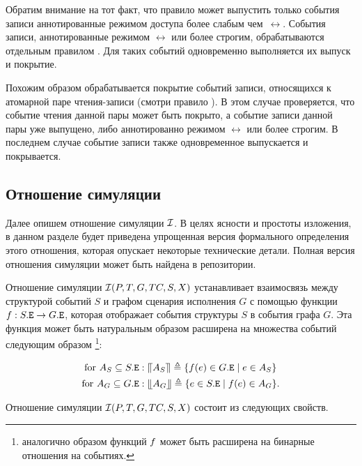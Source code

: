Обратим внимание на тот факт, что правило \IssueStep может выпустить
только события записи аннотированные режимом доступа 
более слабым чем~$\rel$. 
События записи, аннотированные режимом $\rel$ или более строгим, 
обрабатываются отдельным правилом \ReleaseCoverStep. 
Для таких событий одновременно выполняется их выпуск и покрытие.

Похожим образом обрабатывается покрытие событий записи, 
относящихся к атомарной паре чтения-записи (смотри правило \RMWCoverStep). 
В этом случае проверяется, что событие чтения данной 
пары может быть покрыто, а событие записи данной пары уже выпущено, 
либо аннотированно режимом $\rel$ или более строгим. 
В последнем случае событие записи также 
одновременное выпускается и покрывается. 

\subsection{Отношение симуляции}
\label{sec:simrel}

Далее опишем отношение симуляции $\mathcal{I}$.
В целях ясности и простоты изложения, 
в данном разделе будет приведена упрощенная версия формального
определения этого отношения, которая опускает некоторые
технические детали. Полная версия отношения симуляции
может быть найдена в \coq репозитории. 

Отношение симуляции $\mathcal{I}(P, T, G, TC, S, X)$
устанавливает взаимосвязь между структурой событий $S$
и графом сценария исполнения $G$ с помощью
функции $f : S.{\mathtt{E}} \rightarrow G.{\mathtt{E}}$, которая отображает
события структуры $S$ в события графа $G$.
Эта функция может быть натуральным образом
расширена на множества событий следующим образом%
\footnote{аналогично образом функций $f$ может быть расширена
на бинарные отношения на событиях.}:

\begin{align*}
\text{for } A_S \subseteq S.{\mathtt{E}}        & :
  {\llceil A_S \rrceil} \triangleq \{f(e) \in G.{\mathtt{E}} \mid e \in A_S\} \\
\text{for } A_G \subseteq G.{\mathtt{E}}        & :
  {\llfloor A_G \rrfloor} \triangleq \{e \in S.{\mathtt{E}} \mid f(e) \in A_G\}.
\end{align*}

Отношение симуляции $\mathcal{I}(P, T, G, TC, S, X)$ состоит из следующих свойств.

